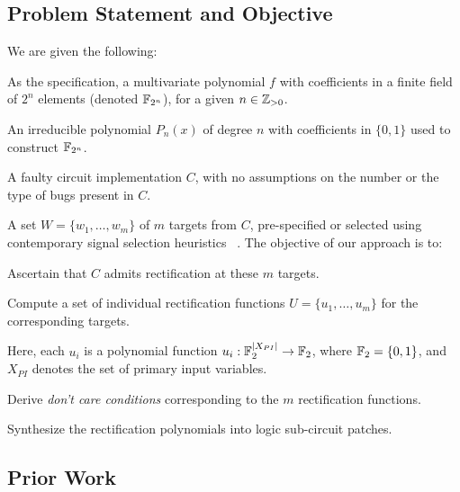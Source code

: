 \subsection{Problem Statement and Objective}
We are given the following: 
\bi
\item As the specification, a multivariate
polynomial $f$ with coefficients in a finite field of $2^n$ elements
(denoted ${\mathbb{F}}_{2^n}$), for a given  $n\in {\mathbb{Z}}_{> 0}$.
\item An irreducible
polynomial $P_n(x)$ of degree $n$ with coefficients in $\{0,1\}$ used 
to construct ${\mathbb{F}}_{2^n}$.
\item A faulty circuit implementation $C$,
with no assumptions on the number or the type of bugs present in
$C$. 
\item A set $W = \{w_1,\dots,w_m\}$ of $m$ targets from $C$,
pre-specified or selected using contemporary signal selection heuristics 
~\cite{SS_Alan:DAC18,SS_Fujita:ISCAS19,SS_Roland:DAC19}.
\ei
The objective of our approach is to: 
\bi
 \item Ascertain that $C$ 
admits rectification at these $m$ targets.
\item Compute a set
of individual rectification functions $U =
\{u_1,\dots,u_m\}$ for the corresponding targets. 
\bi 
\item Here, each $u_i$ is a 
polynomial function $u_i:{\mathbb{F}}_2^{|X_{PI}|}\rightarrow{\mathbb{F}}_2$, where ${\mathbb{F}}_2=\{0,1\}$, 
and $X_{PI}$ denotes the set of primary input variables.
\ei
\item Derive {\it don't care conditions}
corresponding to the $m$ rectification functions. 
\item Synthesize
the rectification polynomials into logic sub-circuit patches.
\ei

\subsection{Prior Work}

